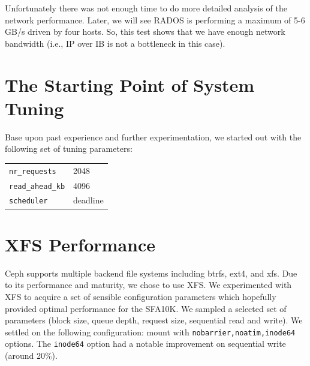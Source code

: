 \documentclass{article}
\begin{document}
Unfortunately there was not enough time to do more detailed analysis of the network
performance. Later, we will see RADOS is performing a
maximum of 5-6 GB/s driven by four hosts.  So, this test shows that we
have enough network bandwidth (i.e., IP over IB is not a bottleneck in this
case).




\section{The Starting Point of System Tuning}

Base upon past experience and further experimentation, we started out with the
following set of tuning parameters:

\begin{table}[htb]
\centering
\begin{tabular}{ll}
    \toprule
    \verb!nr_requests! & 2048 \\
    \verb!read_ahead_kb! & 4096 \\
    \verb!scheduler! & deadline \\
    \bottomrule
\end{tabular}

\end{table}



\section{XFS Performance}

Ceph supports multiple backend file systems including btrfs, ext4, and xfs.
Due to its performance and maturity, we chose to use XFS. We
experimented with XFS to acquire a set of sensible configuration parameters
which hopefully provided optimal performance for the SFA10K. We sampled a selected set of parameters (block size,
queue depth, request size, sequential read and write). We settled on the following
configuration: mount with \verb!nobarrier,noatim,inode64! options.
The \verb!inode64! option had a notable improvement on sequential write (around
20\%).
\end{document}
